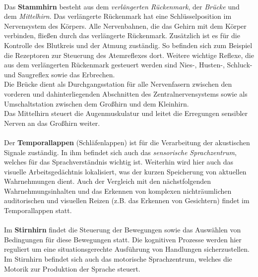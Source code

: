 \\
Das {\bf Stammhirn} besteht aus dem {\it verlängerten Rückenmark}, der {\it Brücke} und dem {\it Mittelhirn}. Das verlängerte Rückenmark hat eine Schlüsselposition im Nervensystem des Körpers. Alle Nervenbahnen, die das Gehirn mit dem Körper verbinden, fließen durch das verlängerte Rückenmark. Zusätzlich ist es für die Kontrolle des Blutkreis und der Atmung zuständig. So befinden sich zum Beispiel die Rezeptoren zur Steuerung des Atemreflexes dort. Weitere wichtige Reflexe, die aus dem verlängerten Rückenmark gesteuert werden sind Nies-, Husten-, Schluck- und Saugreflex sowie das Erbrechen. \\
Die Brücke dient als Durchgangsstation für alle Nervenfasern zwischen den vorderen und dahinterliegenden Abschnitten des Zentralnervensystems sowie als Umschaltstation zwischen dem Großhirn und dem Kleinhirn.\\
Das Mittelhirn steuert die Augenmuskulatur und leitet die Erregungen sensibler Nerven an das Großhirn weiter.\\
\\
Der {\bf Temporallappen} (Schläfenlappen) ist für die Verarbeitung der akustischen Signale zuständig. In ihm befindet sich auch das {\it sensorische Sprachzentrum}, welches für das Sprachverständnis wichtig ist. Weiterhin wird hier auch das visuelle Arbeitsgedächtnis lokalisiert, was der kurzen Speicherung von aktuellen Wahrnehmungen dient. Auch der Vergleich mit den nächstfolgenden Wahrnehmungsinhalten und das Erkennen von komplexen nichträumlichen auditorischen und visuellen Reizen (z.B. das Erkennen von Gesichtern) findet im Temporallappen statt.\\
\\
Im {\bf Stirnhirn} findet die Steuerung der Bewegungen sowie das Auswählen von Bedingungen für diese Bewegungen statt. Die kognitiven Prozesse werden hier reguliert um eine situationsgerechte Ausführung von Handlungen sicherzustellen. Im Stirnhirn befindet sich auch das motorische Sprachzentrum, welches die Motorik zur Produktion der Sprache steuert.\\
